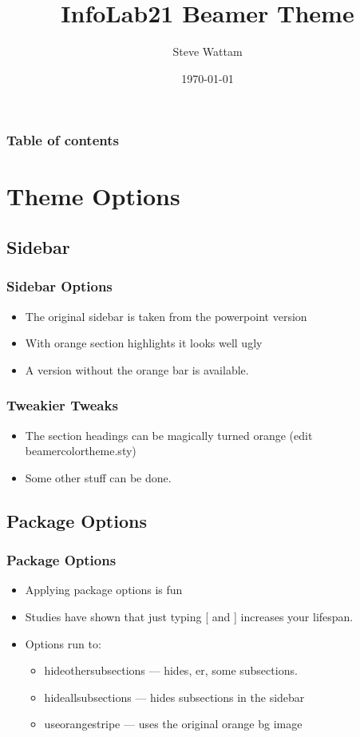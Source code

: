 \documentclass{beamer}
\begin{document}
\title{InfoLab21 Beamer Theme}  
\author{Steve Wattam}
\date{\today} 

\begin{frame}
\titlepage
\end{frame}

\begin{frame}\frametitle{Table of contents}\tableofcontents
\end{frame} 


\section{Theme Options} 
\subsection{Sidebar}
\begin{frame}\frametitle{Sidebar Options}
\begin{itemize}
    \item The original sidebar is taken from the powerpoint version
    \vspace{20pt}
    \item With orange section highlights it looks well ugly
    \vspace{20pt}
    \item A version without the orange bar is available.
\end{itemize} 
\end{frame}

\begin{frame}\frametitle{Tweakier Tweaks}
\begin{itemize}
    \item The section headings can be magically turned orange (edit beamercolortheme.sty)
    \vspace{30pt}
    \item Some other stuff can be done.
\end{itemize} 
\end{frame}

\subsection{Package Options}
\begin{frame}\frametitle{Package Options}
\begin{itemize}
    \item Applying package options is fun
    \vspace{10pt}
    \item Studies have shown that just typing [ and ] increases your lifespan.
    \vspace{10pt}
    \item Options run to:
    \begin{itemize}
	\item hideothersubsections --- hides, er, some subsections.
	\item hideallsubsections --- hides subsections in the sidebar
        \item useorangestripe --- uses the original orange bg image	
    \end{itemize}
\end{itemize} 
\end{frame}
\end{document}
